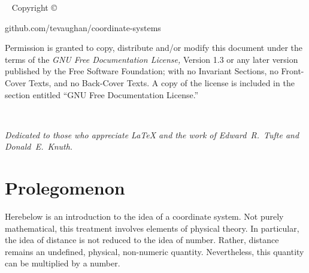 

\frontmatter

\blankpage

\newpage\thispagestyle{empty}
\vfill
{}

\maketitle

\newpage
\begin{fullwidth}
~\vfill
\thispagestyle{empty}
\setlength{\parindent}{0pt}
\setlength{\parskip}{\baselineskip}
Copyright \copyright\ \the\year\ \thanklessauthor

\par{}

\par{github.com/tevaughan/coordinate-systems}

\par Permission is granted to copy, distribute and/or modify this document
   under the terms of the {\it GNU Free Documentation License,} Version 1.3 or
   any later version published by the Free Software Foundation; with no
   Invariant Sections, no Front-Cover Texts, and no Back-Cover Texts.  A copy
   of the license is included in the section entitled ``GNU Free Documentation
   License.''

\end{fullwidth}

\tableofcontents

\listoffigures

\listoftables

\cleardoublepage
~\vfill
\begin{doublespace}
\noindent\fontsize{18}{22}\selectfont\itshape
\nohyphenation
Dedicated to those who appreciate \LaTeX{} 
and the work of \mbox{Edward R.~Tufte} 
and \mbox{Donald E.~Knuth}.
\end{doublespace}
\vfill
\vfill


\cleardoublepage
\chapter*{Prolegomenon}

Herebelow is an introduction to the idea of a coordinate system.  Not purely
mathematical, this treatment involves elements of physical theory.  In
particular, the idea of distance is not reduced to the idea of number.  Rather,
distance remains an undefined, physical, non-numeric quantity.  Nevertheless,
this quantity can be multiplied by a number.

